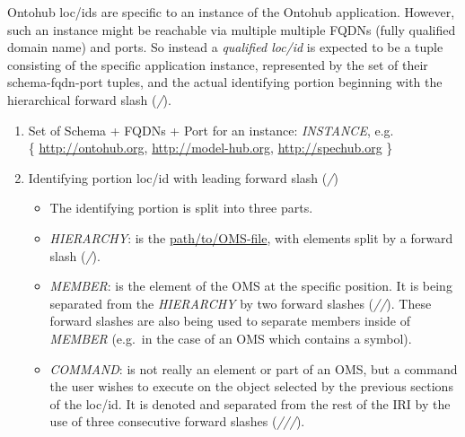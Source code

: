 \documentclass[10pt, a4paper]{isov2}
\begin{document}
Ontohub loc/ids are specific to an instance of the Ontohub application. However,
such an instance might be reachable via multiple multiple FQDNs (fully
qualified domain name) and ports. So instead a
\emph{qualified loc/id} is expected to be a tuple consisting of the specific application
instance, represented by the set of their schema-fqdn-port tuples, and the
actual identifying portion beginning with the hierarchical forward slash
(\emph{/}).




\begin{enumerate}
  \item Set of Schema + FQDNs + Port for an instance: \emph{INSTANCE}, e.g.\\
    \{ \url{http://ontohub.org}, \url{http://model-hub.org}, \url{http://spechub.org} \}
  \item Identifying portion loc/id with leading forward slash (\emph{/})
  \begin{itemize}
    \item The identifying portion is split into three parts.
    \item \emph{HIERARCHY}: is the \url{path/to/OMS-file}, with elements
      split by a forward slash (\emph{/}).
    \item \emph{MEMBER}: is the element of the OMS at the specific
      position. It is being separated from the \emph{HIERARCHY} by two
      forward slashes (\emph{//}). These forward slashes are also being used to
      separate members inside of \emph{MEMBER} (e.g.\ in the case of an
      OMS which contains a symbol).
    \item \emph{COMMAND}: is not really an element or part of an OMS,
      but a command the user wishes to execute on the object selected by the
      previous sections of the loc/id. It is denoted and separated from the
      rest of the IRI by the use of three consecutive forward slashes
      (\emph{///}).
  \end{itemize}
\end{enumerate}


\end{document}
